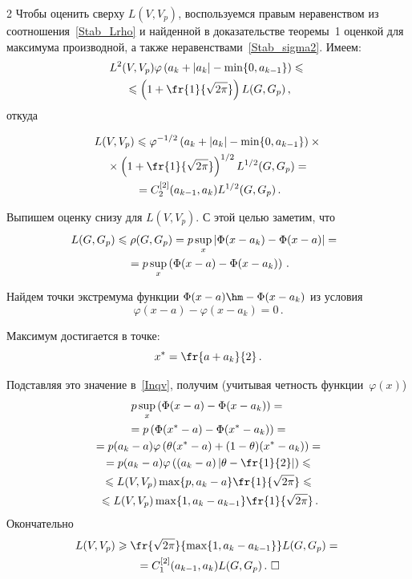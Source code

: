 \begin{multicols}{2}
Чтобы оценить сверху $L(V,V_p)$, воспользуемся правым
неравенством из соотношения~\eqref{Stab_Lrho} и найденной в
доказательстве теоремы~1 оценкой для
максимума производной, а также неравенствами~\eqref{Stab_sigma2}.
Имеем:
\begin{multline*}
L^2(V,V_p)\varphi\left(a_k+|a_k|-\min\{0,a_{k-1}\}\right)\leqslant{}\\
{}\leqslant
\left(1+\fr{1}{\sqrt{2\pi}}\right)L(G,G_p)\,,
\end{multline*}
%
откуда

\noindent
\begin{multline*}
L(V,V_p)\leqslant\varphi^{-1/2}
\left(a_k+|a_k|-\min\{0,a_{k-1}\}\right)\times{}\\
{}\times
\left(1+\fr{1}{\sqrt{2\pi}}\right)^{1/2}L^{1/2}(G,G_p)={}\\
{}=C_2^{[2]}(a_{k-1},a_k)L^{1/2}(G,G_p)\,.
\end{multline*}

Выпишем оценку снизу для $L(V,V_p)$. С этой целью заметим, что
\begin{multline}
\label{Inqv}
\hspace*{-5.16743pt}L(G,G_p)\leqslant\rho(G,G_p)=p\sup\limits_x|\Phi(x-a_k)-\Phi(x-a)|
={}\\
{}=p\sup\limits_x\left(\Phi(x-a)-\Phi(x-a_k)\right)\,.
\end{multline}


Найдем точки экстремума функции $\Phi(x-a)\hm-\Phi(x-a_k)$ из условия
$$
\varphi(x-a)-\varphi(x-a_k)=0\,.
$$

Максимум достигается в точке:
$$
x^*=\fr{a+a_k}{2}\,.
$$

Подставляя это значение в~\eqref{Inqv}, получим (учитывая четность
функции~$\varphi(x)$)
\begin{multline*}
p\sup\limits_x\left(\Phi(x-a)-\Phi(x-a_k)\right)
={}\\
{}=p\left(\Phi(x^*-a)-\Phi(x^*-a_k)\right)={}\\
{}=p(a_k-a)\varphi\left(\theta(x^*-a)+(1-\theta)(x^*-a_k)\right)={}\\
{}= p(a_k-a)\varphi\left((a_k-a)\left\vert\theta-\fr{1}{2}\right\vert\right)\leqslant{}\\
{}\leqslant L(V,V_p)\max\{p,a_k-a\}\fr{1}{\sqrt{2\pi}}
\leqslant{}\\
{}\leqslant L(V,V_p)\max\{1,a_k-a_{k-1}\}\fr{1}{\sqrt{2\pi}}\,.
\end{multline*}
%
Окончательно
\begin{multline*}
L(V,V_p)\geqslant\fr{\sqrt{2\pi}}{\max\{1,a_k-a_{k-1}\}}L(G,G_p)
={}\\
{}=C_1^{[2]}(a_{k-1},a_k)L(G,G_p)\,.~\square
\end{multline*}


\end{multicols}
